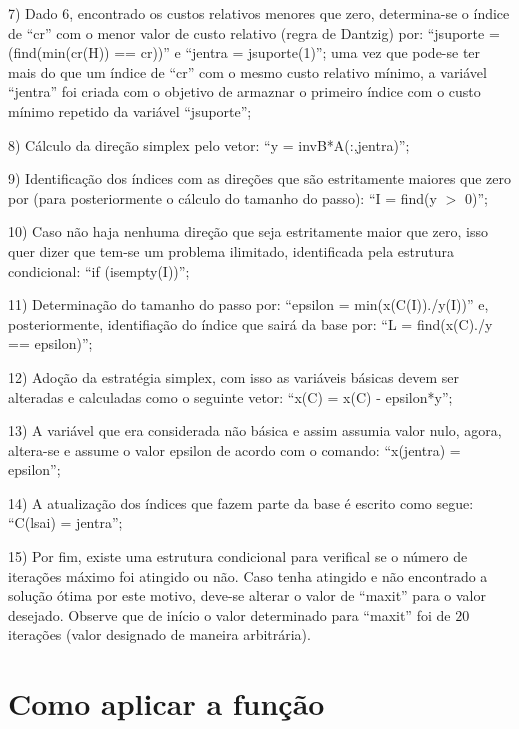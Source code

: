 \documentclass[10pt]{article}
\begin{document}
7) Dado 6, encontrado os custos relativos menores que zero, determina-se o índice de ``cr'' com o menor valor de custo relativo (regra de Dantzig) por: ``jsuporte = (find(min(cr(H)) == cr))'' e ``jentra = jsuporte(1)''; uma vez que pode-se ter mais do que um índice de ``cr'' com o mesmo custo relativo mínimo, a variável ``jentra'' foi criada com o objetivo de armaznar o primeiro índice com o custo mínimo repetido da variável ``jsuporte'';
\newline

8) Cálculo da direção simplex pelo vetor: ``y = invB*A(:,jentra)''; 
\newline

9) Identificação dos índices com as direções que são estritamente maiores que zero por (para posteriormente o cálculo do tamanho do passo): ``I = find(y $>$ 0)'';
\newline

10) Caso não haja nenhuma direção que seja estritamente maior que zero, isso quer dizer que tem-se um problema ilimitado, identificada pela estrutura condicional: ``if (isempty(I))'';
\newline

11) Determinação do tamanho do passo por: ``epsilon = min(x(C(I))./y(I))'' e, posteriormente, identifiação do índice que sairá da base por: ``L = find(x(C)./y == epsilon)'';
\newline

12) Adoção da estratégia simplex, com isso as variáveis básicas devem ser alteradas e calculadas como o seguinte vetor: ``x(C) = x(C) - epsilon*y'';
\newline

13) A variável que era considerada não básica e assim assumia valor nulo, agora, altera-se e assume o valor epsilon de acordo com o comando: ``x(jentra) = epsilon'';
\newline

14) A atualização dos índices que fazem parte da base é escrito como segue: ``C(lsai) = jentra'';
\newline

15) Por fim, existe uma estrutura condicional para verifical se o número de iterações máximo foi atingido ou não. Caso tenha atingido e não encontrado a solução ótima por este motivo, deve-se alterar o valor de ``maxit'' para o valor desejado. Observe que de início o valor determinado para ``maxit'' foi de $20$ iterações (valor designado de maneira arbitrária).
\newline
\section{Como aplicar a função}
\end{document}
